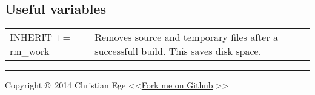 \documentclass[10pt,a4paper,landscape]{article}
\begin{document}
\begin{multicols}{2}
\section{Useful variables}
\begin{tabular}{p{5.5cm}p{\linewidth - 6.4cm}}
INHERIT += rm\_work & Removes source and temporary files after a successfull build. This saves disk space.
\end{tabular}

\rule{\linewidth}{0.25pt}
\scriptsize

Copyright \copyright\ 2014 Christian Ege \textless\textless \href{http://cybertux.github.io/cheatsheets}{Fork me on Github}.\textgreater \textgreater

%

\end{multicols}
\end{document}
